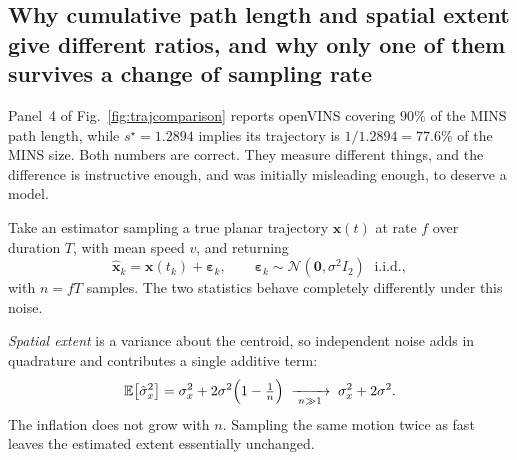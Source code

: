 \subsection{Why cumulative path length and spatial extent give different
ratios, and why only one of them survives a change of sampling rate}
\label{sec:july29extent}
Panel~4 of Fig.~\ref{fig:trajcomparison} reports openVINS covering $90\%$ of
the MINS path length, while $s^{\star}=1.2894$ implies its trajectory is
$1/1.2894=77.6\%$ of the MINS size. Both numbers are correct. They measure
different things, and the difference is instructive enough, and was
initially misleading enough, to deserve a model.

Take an estimator sampling a true planar trajectory $\mathbf{x}(t)$ at rate
$f$ over duration $T$, with mean speed $v$, and returning
\begin{equation}
\hat{\mathbf{x}}_k=\mathbf{x}(t_k)+\boldsymbol{\varepsilon}_k,
\qquad \boldsymbol{\varepsilon}_k\sim\mathcal{N}(\mathbf{0},\sigma^{2}I_2)
\;\text{ i.i.d.},
\label{eq:noisemodel}
\end{equation}
with $n=fT$ samples. The two statistics behave completely differently under
this noise.

\emph{Spatial extent} is a variance about the centroid, so independent noise
adds in quadrature and contributes a single additive term:
\begin{equation}
\mathbb{E}\bigl[\hat\sigma_x^{2}\bigr]
  =\sigma_x^{2}+2\sigma^{2}\Bigl(1-\tfrac1n\Bigr)
  \;\xrightarrow[\;n\gg1\;]{}\;\sigma_x^{2}+2\sigma^{2}.
\label{eq:extentbias}
\end{equation}
The inflation does not grow with $n$. Sampling the same motion twice as
fast leaves the estimated extent essentially unchanged.

